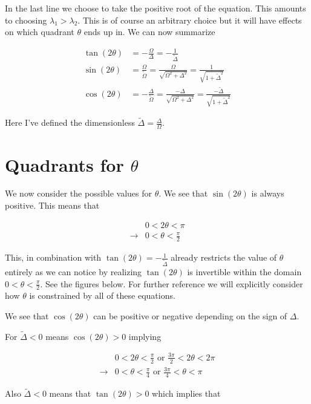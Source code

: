 \documentclass[12pt]{article}
\begin{document}
In the last line we choose to take the positive root of the equation. This amounts to choosing $\lambda_1 > \lambda_2$. This is of course an arbitrary choice but it will have effects on which quadrant $\theta$ ends up in.
We can now summarize

\begin{align}
\tan(2\theta) &= -\frac{\Omega}{\Delta} = -\frac{1}{\tilde{\Delta}}\\
\sin(2\theta) &= \frac{\Omega}{\tilde{\Omega}} = \frac{\Omega}{\sqrt{\Omega^2+\Delta^2}} = \frac{1}{\sqrt{1+\tilde{\Delta}^2}}\\
\cos(2\theta) &= -\frac{\Delta}{\tilde{\Omega}} = \frac{-\Delta}{\sqrt{\Omega^2+\Delta^2}} = \frac{-\tilde{\Delta}}{\sqrt{1+\tilde{\Delta}^2}}
\end{align}

Here I've defined the dimensionless $\tilde{\Delta}=\frac{\Delta}{\Omega}$. 

\section{Quadrants for $\theta$}
We now consider the possible values for $\theta$. We see that $\sin(2\theta)$ is always positive. This means that

\begin{align}
&0<2\theta<\pi\\
\rightarrow &0<\theta<\frac{\pi}{2}
\end{align}

This, in combination with $\tan(2\theta) = -\frac{1}{\tilde{\Delta}}$ already restricts the value of $\theta$ entirely as we can notice by realizing $\tan(2\theta)$ is invertible within the domain $0<\theta<\frac{\pi}{2}$. See the figures below. For further reference we will explicitly consider how $\theta$ is constrained by all of these equations.

We see that $\cos(2\theta)$ can be positive or negative depending on the sign of $\Delta$.

For $\tilde{\Delta}<0$ means $\cos(2\theta)>0$ implying

\begin{align}
&0<2\theta<\frac{\pi}{2} \text{ or } \frac{3\pi}{2} < 2\theta < 2\pi \\
\rightarrow &0<\theta<\frac{\pi}{4} \text{ or } \frac{3\pi}{4} < \theta<\pi 
\end{align}

Also $\tilde{\Delta}<0$ means that $\tan(2\theta)>0$ which implies that
\end{document}
